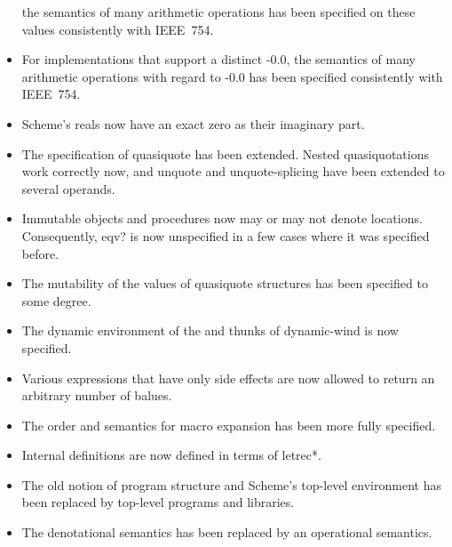 \begin{itemize}
  the semantics of many arithmetic operations has been specified on
  these values consistently with IEEE~754.
\item For implementations that support a distinct -0.0, the semantics
  of many arithmetic operations with regard to -0.0 has been specified
  consistently with IEEE~754.
\item Scheme's reals now have an exact zero as their imaginary part.
\item The specification of {\cf quasiquote} has been extended.  Nested
  quasiquotations work correctly now, and {\cf unquote} and {\cf
    unquote-splicing} have been extended to several operands.
\item Immutable objects and procedures now may or may not denote
  locations.  Consequently, {\cf eqv?} is now unspecified in a few
  cases where it was specified before.
\item The mutability of the values of {\cf quasiquote} structures has
  been specified to some degree.
\item The dynamic environment of the  and 
  thunks of {\cf dynamic-wind} is now specified.
\item Various expressions that have only side effects are now allowed
  to return an arbitrary number of balues.
\item The order and semantics for macro expansion has been more fully
  specified.
\item Internal definitions are now defined in terms of {\cf letrec*}.
\item The old notion of program structure and Scheme's top-level
  environment has been replaced by top-level programs and libraries.
\item The denotational semantics has been replaced by an operational
  semantics.
\end{itemize}

